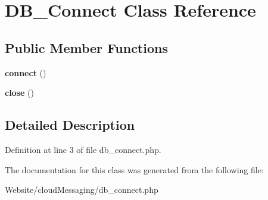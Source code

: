 \hypertarget{class_d_b___connect}{\section{D\-B\-\_\-\-Connect Class Reference}
\label{class_d_b___connect}
}
\subsection*{Public Member Functions}
\begin{DoxyCompactItemize}
\item 
\hypertarget{class_d_b___connect_a78572828d11dcdf2a498497d9001d557}{{\bfseries connect} ()}\label{class_d_b___connect_a78572828d11dcdf2a498497d9001d557}

\item 
\hypertarget{class_d_b___connect_aa69c8bf1f1dcf4e72552efff1fe3e87e}{{\bfseries close} ()}\label{class_d_b___connect_aa69c8bf1f1dcf4e72552efff1fe3e87e}

\end{DoxyCompactItemize}


\subsection{Detailed Description}


Definition at line 3 of file db\-\_\-connect.\-php.



The documentation for this class was generated from the following file\-:\begin{DoxyCompactItemize}
\item 
Website/cloud\-Messaging/db\-\_\-connect.\-php\end{DoxyCompactItemize}
